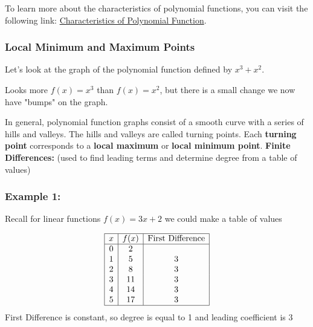 \documentclass{article}
\begin{document}
To learn more about the characteristics of polynomial functions, you can visit the following link: \href{https://mathematicalmysteries.org/characteristics-of-polynomials/}{Characteristics of Polynomial Function}.

\subsubsection{Local Minimum and Maximum Points}
Let's look at the graph of the polynomial function defined by $x^3+x^2$.

\begin{minipage}{0.6\linewidth}
\centering
{}
\end{minipage}%
\begin{minipage}{0.4\linewidth}
Looks more $f(x)=x^3$ than $f(x)=x^2$, but there is a small change we now have "bumps" on the graph.
\end{minipage}
In general, polynomial function graphs consist of a smooth curve with a series of hills and valleys. The hills and valleys are called turning points. Each \textbf{turning point} corresponds to a \textbf{local maximum} or \textbf{local minimum point}. 
\newpage 
\textbf{Finite Differences:}{ (used to find leading terms and determine degree from a table of values)}
\subsubsection*{Example 1:} 
Recall for linear functions $f(x) = 3x + 2$ we could make a table of values 

\[
\begin{array}{|c|c|c|}
\hline
x & f(x) & \text{First Difference} \\
\hline
0 & 2 & \\
1 & 5 & 3 \\
2 & 8 & 3 \\
3 & 11 & 3 \\
4 & 14 & 3 \\
5 & 17 & 3 \\
\hline
\end{array}
\]
First Difference is constant, so degree is equal to 1 and leading coefficient is 3 
\end{document}
